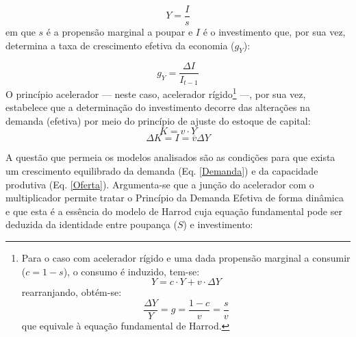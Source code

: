 \begin{equation}
\label{Demanda}
Y = \frac{I}{s}
\end{equation}
em que $s$ é a propensão marginal a poupar e $I$ é o investimento que, por sua vez, determina a taxa de crescimento efetiva da economia ($g_Y$):

\begin{equation}
\label{crescimento_efetivo}
	g_Y = \frac{\Delta I}{I_{t-1}}
\end{equation}
O princípio acelerador --- neste caso, acelerador rígido\footnote{
	Para o caso com acelerador rígido e uma dada propensão marginal a consumir ($c = 1-s$), o consumo é induzido, tem-se:
	$$
	Y = c\cdot Y + v\cdot \Delta Y
	$$
	rearranjando, obtém-se:
	$$
	\frac{\Delta Y}{Y} = g = \frac{1 - c}{v} = \frac{s}{v}
	$$
	que equivale à equação fundamental de Harrod.
} ---, por sua vez, estabelece que a determinação do investimento decorre das alterações na demanda (efetiva) por meio do princípio de ajuste do estoque de capital:
$$
K = v\cdot Y
$$
\begin{equation}
\Delta K = I = \overline{v}\Delta Y
\end{equation}


A questão que permeia os modelos analisados são as condições para que exista um crescimento equilibrado da demanda (Eq. \ref{Demanda}) e da capacidade produtiva (Eq. \ref{Oferta}). 
Argumenta-se que a junção do acelerador com o multiplicador permite tratar o Princípio da Demanda Efetiva de forma dinâmica e que esta é a essência do modelo de Harrod cuja equação fundamental pode ser deduzida da identidade entre poupança ($S$) e investimento:

